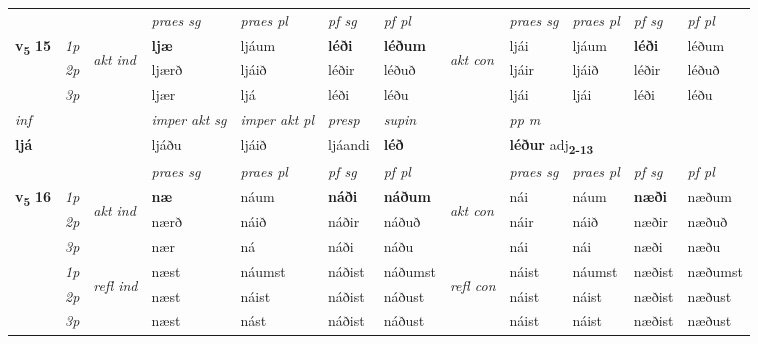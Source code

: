 \begin{longtable}[l]{X>{\footnotesize\itshape}llXXXXlXXXX}
\midrule

 & &   & \textit{praes sg}  & \textit{praes pl}    & \textit{ pf sg} & \textit{pf pl} & & \textit{praes sg}  & \textit{praes pl}    & \textit{pf sg} & \textit{pf pl }  \\ \cmidrule{4-7} \cmidrule{9-12}
 \multirow{2}{*}{{{\textbf{v{\textsubscript{5}}} \Large{\textbf{15}}}}}  & 1p & \multirow{3}{*}{\begin{turn}{90}\textit{akt ind}\end{turn}} & \textbf{ljæ} & ljáum & \textbf{léði} & \textbf{léðum} & \multirow{3}{*}{\begin{turn}{90}\textit{akt con}\end{turn}} &ljái & ljáum & \textbf{léði} & léðum\\*
 & 2p &  &  ljærð  & ljáið & léðir & léðuð & & ljáir & ljáið & léðir & léðuð \\*
 & 3p &  & ljær & ljá & léði & léðu & & ljái & ljái& léði & léðu \\*
\cmidrule{4-7} \cmidrule{9-12}

   {\textit{inf}} & &  & \textit{imper akt sg} & \textit{imper akt pl}   & \textit{presp} & \textit{supin}  && \textit{pp m} \\*
  {\textbf{ljá}} & && ljáðu  & ljáið   & ljáandi &  \textbf{léð}  && \multicolumn{2}{l}{\textbf{léður} adj\textbf{\textsubscript{2-13}}} \\*

\midrule

 & &   & \textit{praes sg}  & \textit{praes pl}    & \textit{ pf sg} & \textit{pf pl} & & \textit{praes sg}  & \textit{praes pl}    & \textit{pf sg} & \textit{pf pl }  \\ \cmidrule{4-7} \cmidrule{9-12}
 \multirow{2}{*}{{{\textbf{v{\textsubscript{5}}} \Large{\textbf{16}}}}}  & 1p & \multirow{3}{*}{\begin{turn}{90}\textit{akt ind}\end{turn}} & \textbf{næ} & náum & \textbf{náði} & \textbf{náðum} & \multirow{3}{*}{\begin{turn}{90}\textit{akt con}\end{turn}} &nái & náum & \textbf{næði} & næðum\\*
 & 2p &  &  nærð  & náið & náðir & náðuð & & náir & náið & næðir & næðuð \\*
 & 3p &  & nær & ná & náði & náðu & & nái & nái& næði & næðu \\*
\cmidrule{4-7} \cmidrule{9-12}
 & 1p & \multirow{3}{*}{\begin{turn}{90}\textit{refl ind}\end{turn}}  & næst & náumst & náðist & náðumst & \multirow{3}{*}{\begin{turn}{90}\textit{refl con}\end{turn}}  &náist & náumst & næðist & næðumst \\*
 & 2p &  & næst & náist & náðist & náðust & &náist & náist & næðist & næðust \\*
 & 3p  & & næst & nást & náðist & náðust & & náist & náist& næðist & næðust \\*
\cmidrule{4-7} \cmidrule{9-12}


\end{longtable}
